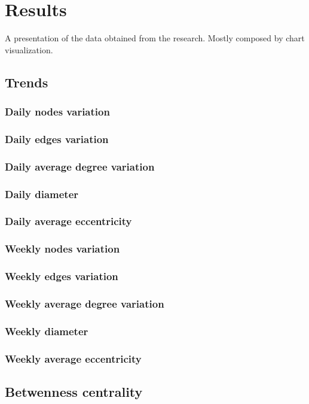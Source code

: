 
	\chapter{Results}
	A presentation of the data obtained from the research. Mostly composed by chart visualization.
	\section{Trends}
	\subsection{Daily nodes variation}
	\subsection{Daily edges variation}
	\subsection{Daily average degree variation}
	\subsection{Daily diameter}
	\subsection{Daily average eccentricity}
	\subsection{Weekly nodes variation}
	\subsection{Weekly edges variation}
	\subsection{Weekly average degree variation}
	\subsection{Weekly diameter}
	\subsection{Weekly average eccentricity}
	\section{Betwenness	 centrality}
